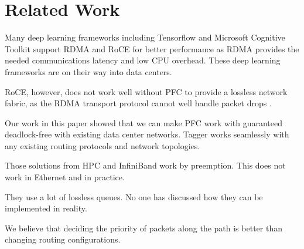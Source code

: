 \section{Related Work}\label{sec:related}

Many deep learning frameworks including Tensorflow \cite{tensorflow} and Microsoft Cognitive Toolkit \cite{cntk} support RDMA and RoCE for better performance as RDMA provides the needed communications latency and low CPU overhead. These deep learning frameworks are on their way into data centers.

RoCE, however, does not work well without PFC to provide a lossless network fabric, as the RDMA transport protocol cannot well handle packet drops \cite{dcqcn,rdmaatscale}.

Our work in this paper showed that we can make PFC work with guaranteed deadlock-free with existing data center networks. Tagger works seamlessly with any existing routing protocols and network topologies.

 Those solutions from HPC and InfiniBand
work by preemption. This does not work in Ethernet and in practice.

 They use a lot of lossless queues. No one
has discussed how they can be implemented in reality.

We believe that deciding the priority of packets along the path is better than changing
routing configurations.
